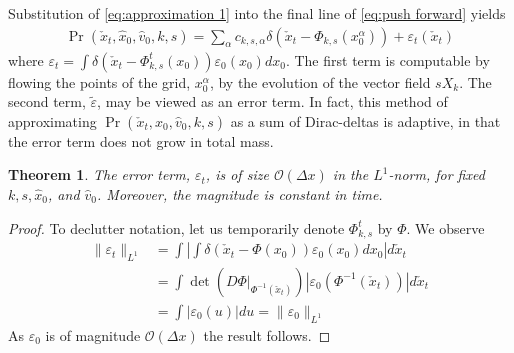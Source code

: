 \documentclass[conference]{IEEEtran}
\newtheorem{thm}{Theorem}
\begin{document}
Substitution of \eqref{eq:approximation 1} into the final line of \eqref{eq:push forward} yields
\begin{align*}
	\Pr( \check{x}_t , \hat{x}_0, \hat{v}_0, k,s) = \sum_\alpha c_{k,s,\alpha} \delta \left( \check{x}_t - \Phi_{k,s}( x_0^\alpha) \right) + \varepsilon_t( \check{x}_t)
\end{align*}
where $\varepsilon_t = \int \delta\left( \check{x}_t - \Phi_{k,s}^{t}( x_0) \right)  \varepsilon_0(x_0) dx_0$.
The first term is computable by flowing the points of the grid, $x_0^\alpha$, by the evolution of the vector field $s X_k$.
The second term, $\tilde{\varepsilon}$, may be viewed as an error term.
In fact, this method of approximating $\Pr( \check{x}_t , \hat{x}_0, \hat{v}_0, k,s)$ as a sum of Dirac-deltas is adaptive, in that the error term does not grow in total mass.

\begin{thm} \label{thm:error}
	The error term, $\varepsilon_t$, is of size $\mathcal{O}( \Delta x)$ in the $L^1$-norm, for fixed $k,s,\hat{x}_0$, and $\hat{v}_0$.
	Moreover, the magnitude is constant in time.
\end{thm}
\begin{proof}
	To declutter notation, let us temporarily denote $\Phi_{k,s}^t$ by $\Phi$.
	We observe
\begin{align*}
	\| \varepsilon_t \|_{L^1} &= \int \left| \int \delta( \check{x}_t - \Phi(x_0) ) \varepsilon_0(x_0) dx_0 \right| d\check{x}_t \\
	&= \int \det( \left. D\Phi \right|_{\Phi^{-1}( \check{x}_t) }) |\varepsilon_{0}( \Phi^{-1}( \check{x}_t )) | d\check{x}_t \\
	&= \int | \varepsilon_0( u) | du = \| \varepsilon_0 \|_{L^1}
\end{align*}
As $\varepsilon_0$ is of magnitude $\mathcal{O}( \Delta x)$ the result follows.
\end{proof}
\end{document}
